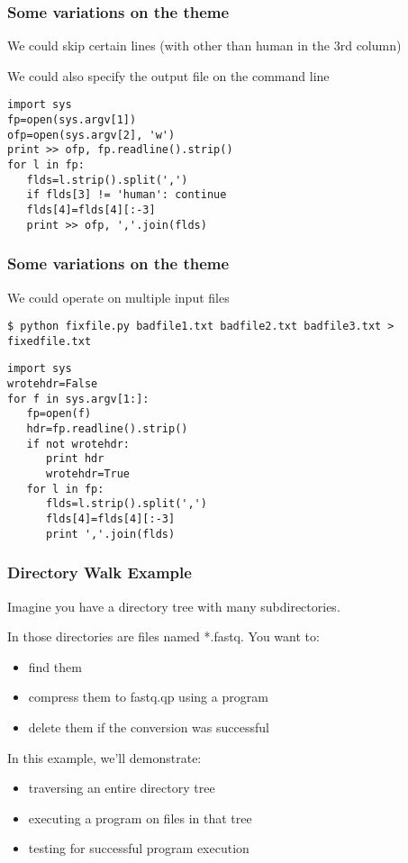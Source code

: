 \documentclass[10pt]{beamer}
\begin{document}
\begin{frame}[fragile]
\frametitle{Some variations on the theme}

We could skip certain lines (with other than human in the 3rd column)
\vspace{2mm}

We could also specify the output file on the command line
\vspace{2mm}

\begin{verbatim}
import sys
fp=open(sys.argv[1])
ofp=open(sys.argv[2], 'w')
print >> ofp, fp.readline().strip()
for l in fp:
   flds=l.strip().split(',')
   if flds[3] != 'human': continue
   flds[4]=flds[4][:-3]
   print >> ofp, ','.join(flds)
\end{verbatim}
\end{frame}

\begin{frame}[fragile]
\frametitle{Some variations on the theme}

We could operate on multiple input files
\begin{verbatim}
$ python fixfile.py badfile1.txt badfile2.txt badfile3.txt > fixedfile.txt
\end{verbatim}

\begin{verbatim}
import sys
wrotehdr=False
for f in sys.argv[1:]:
   fp=open(f)
   hdr=fp.readline().strip()
   if not wrotehdr:
      print hdr
      wrotehdr=True
   for l in fp:
      flds=l.strip().split(',')
      flds[4]=flds[4][:-3]
      print ','.join(flds)
\end{verbatim}
\end{frame}


\begin{frame}[fragile]
\frametitle{Directory Walk Example}

Imagine you have a directory tree with many subdirectories.  
\vspace{2mm}

In those directories are files named *.fastq.  You want to:
\begin{itemize}
\item find them
\item compress them to fastq.qp using a program
\item delete them if the conversion was successful
\end{itemize}

In this example, we'll demonstrate:

\begin{itemize}
\item traversing an entire directory tree
\item executing a program on files in that tree
\item testing for successful program execution
\end{itemize}

\end{frame}
\end{document}
